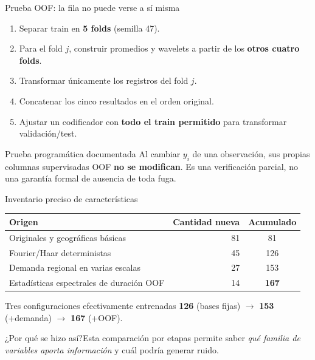 \documentclass[aspectratio=169,11pt]{beamer}
\newcommand{\porq}[1]{\vspace{1.2mm}\begin{block}{¿Por qué se hizo así?}\small #1\end{block}}
\begin{document}
\begin{frame}{Prueba OOF: la fila no puede verse a sí misma}
\small
\begin{enumerate}
\item Separar train en \textbf{5 folds} (semilla 47).
\item Para el fold \(j\), construir promedios y wavelets a partir de los \textbf{otros cuatro folds}.
\item Transformar únicamente los registros del fold \(j\).
\item Concatenar los cinco resultados en el orden original.
\item Ajustar un codificador con \textbf{todo el train permitido} para transformar validación/test.
\end{enumerate}
\begin{block}{Prueba programática documentada}
Al cambiar \(y_i\) de una observación, sus propias columnas supervisadas OOF \textbf{no se modifican}. Es una verificación parcial, no una garantía formal de ausencia de toda fuga.
\end{block}
\end{frame}

\begin{frame}{Inventario preciso de características}
\small
\begin{center}
\begin{tabular}{lrc}
\toprule
\textbf{Origen} & \textbf{Cantidad nueva} & \textbf{Acumulado}\\
\midrule
Originales y geográficas básicas & 81 & 81\\
Fourier/Haar deterministas & 45 & 126\\
Demanda regional en varias escalas & 27 & 153\\
Estadísticas espectrales de duración OOF & 14 & \textbf{167}\\
\bottomrule
\end{tabular}
\end{center}
\begin{block}{Tres configuraciones efectivamente entrenadas}
\centering \textbf{126} (bases fijas) $\longrightarrow$ \textbf{153} (+demanda) $\longrightarrow$ \textbf{167} (+OOF).
\end{block}
\porq{Esta comparación por etapas permite saber \emph{qué familia de variables aporta información} y cuál podría generar ruido.}
\end{frame}
\end{document}
